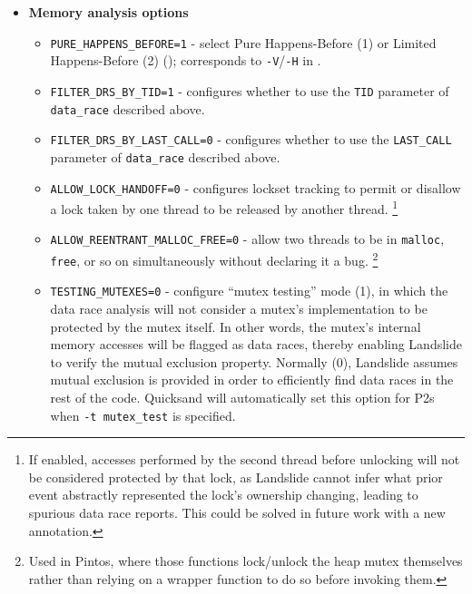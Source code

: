 \begin{itemize}
\item {\bf Memory analysis options}
\begin{itemize}
	\item {\tt PURE\_HAPPENS\_BEFORE=1} - select Pure Happens-Before (1) or Limited Happens-Before (2) (\sect{\ref{sec:background-hb}});
		corresponds to {\tt -V}/{\tt -H} in \sect{\ref{sec:landslide-quicksand-options}}.
	\item {\tt FILTER\_DRS\_BY\_TID=1} - configures whether to use the {\tt TID} parameter of {\tt data\_race} described above.
	\item {\tt FILTER\_DRS\_BY\_LAST\_CALL=0} - configures whether to use the {\tt LAST\_CALL} parameter of {\tt data\_race} described above.
	\item {\tt ALLOW\_LOCK\_HANDOFF=0} - configures lockset tracking to permit or disallow a lock taken by one thread to be released by another thread.%
		\footnote{If enabled, accesses performed by the second thread before unlocking will not be considered protected by that lock,
			as Landslide cannot infer what prior event abstractly represented the lock's ownership changing,
			leading to spurious data race reports.
			This could be solved in future work with a new annotation.}
	\item {\tt ALLOW\_REENTRANT\_MALLOC\_FREE=0} - allow two threads to be in {\tt malloc}, {\tt free}, or so on simultaneously without declaring it a bug.%
		\footnote{Used in Pintos, where those functions lock/unlock the heap mutex themselves rather than relying on a wrapper function to do so before invoking them.}
	\item {\tt TESTING\_MUTEXES=0} - configure ``mutex testing'' mode (1),
		in which the data race analysis will not consider a mutex's implementation to be protected by the mutex itself.
		In other words, the mutex's internal memory accesses will be flagged as data races,
		thereby enabling Landslide to verify the mutual exclusion property.
		Normally (0), Landslide assumes mutual exclusion is provided in order to efficiently find data races in the rest of the code.
		Quicksand will automatically set this option for P2s when {\tt -t mutex\_test} is specified.
\end{itemize}


\end{itemize}
